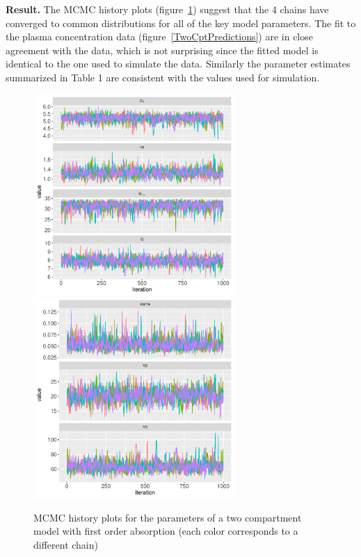 \documentclass[11pt]{amsart}
\begin{document}
\textbf{Result.} The MCMC history plots (figure~\ref{TwoCptMCMC}) suggest that the 4 chains have converged to common distributions for all of the key model parameters. The  fit to the plasma concentration data (figure~\ref{TwoCptPredictions}) are in close agreement with the data, which is not surprising since the fitted model is identical to the one used to simulate the data. Similarly the parameter estimates summarized in Table 1 are consistent with the values used for simulation.

\begin{figure}[htbp]
\includegraphics[width=3.0in,trim=0in 0in 0 0in]{graphics/TwoCptModelExamplePlots001.pdf}
\includegraphics[width=3.0in,trim=0in 0in 0 0in]{graphics/TwoCptModelExamplePlots002.pdf}
\caption{{MCMC history plots for the parameters of a two compartment model with first order absorption (each color corresponds to a different chain)}}
\label{TwoCptMCMC}
\end{figure}
\end{document}
